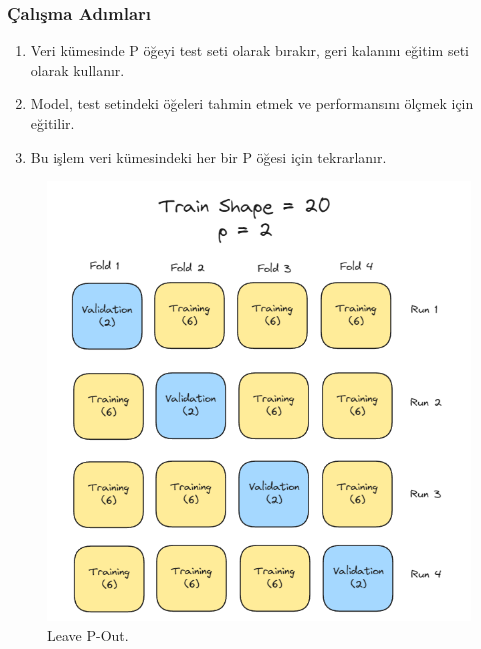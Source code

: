 \subsubsection{Çalışma Adımları}
\begin{enumerate}
    \item Veri kümesinde P öğeyi test seti olarak bırakır, geri kalanını eğitim seti olarak kullanır.
    \item Model, test setindeki öğeleri tahmin etmek ve performansını ölçmek için eğitilir.
    \item Bu işlem veri kümesindeki her bir P öğesi için tekrarlanır.
\end{enumerate}

\newpage

\begin{figure}[h]
    \centering
    \includegraphics[width=1\textwidth]{images/leave_p_out_structure.png}
    \caption{Leave P-Out.}
    \label{fig:enter-label}
\end{figure}

